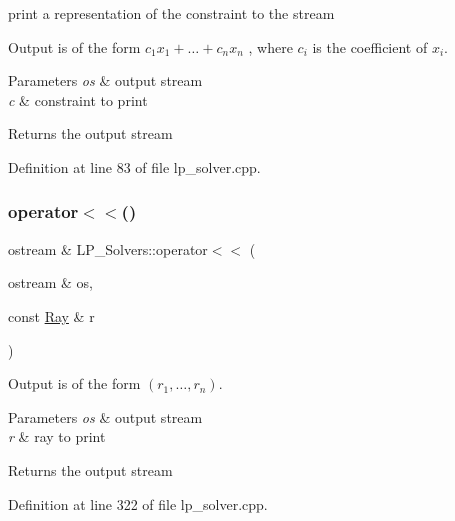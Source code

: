 print a representation of the constraint to the stream 

Output is of the form $ c_1 x_1 + \ldots + c_n x_n $ , where $ c_i $ is the coefficient of $ x_i $.


\begin{DoxyParams}{Parameters}
{\em os} & output stream \\
\hline
{\em c} & constraint to print \\
\hline
\end{DoxyParams}
\begin{DoxyReturn}{Returns}
the output stream 
\end{DoxyReturn}


Definition at line 83 of file lp\+\_\+solver.\+cpp.

\mbox{\label{namespace_l_p___solvers_a7f4d40aebb685ca6ddc48f91939bb523}} 
\subsubsection{\texorpdfstring{operator$<$$<$()}{operator<<()}\hspace{0.1cm}{\footnotesize\ttfamily [3/4]}}
{\footnotesize\ttfamily ostream \& L\+P\+\_\+\+Solvers\+::operator$<$$<$ (\begin{DoxyParamCaption}\item[{ostream \&}]{os,  }\item[{const \hyperlink{group___c_l_s_solvers_class_l_p___solvers_1_1_ray}{Ray} \&}]{r }\end{DoxyParamCaption})}



Output is of the form $(r_1, \ldots, r_n)$. 


\begin{DoxyParams}{Parameters}
{\em os} & output stream \\
\hline
{\em r} & ray to print \\
\hline
\end{DoxyParams}
\begin{DoxyReturn}{Returns}
the output stream 
\end{DoxyReturn}


Definition at line 322 of file lp\+\_\+solver.\+cpp.

\mbox{\label{namespace_l_p___solvers_afdd12afffaacd4070fc0aa3b1297d47d}} 
